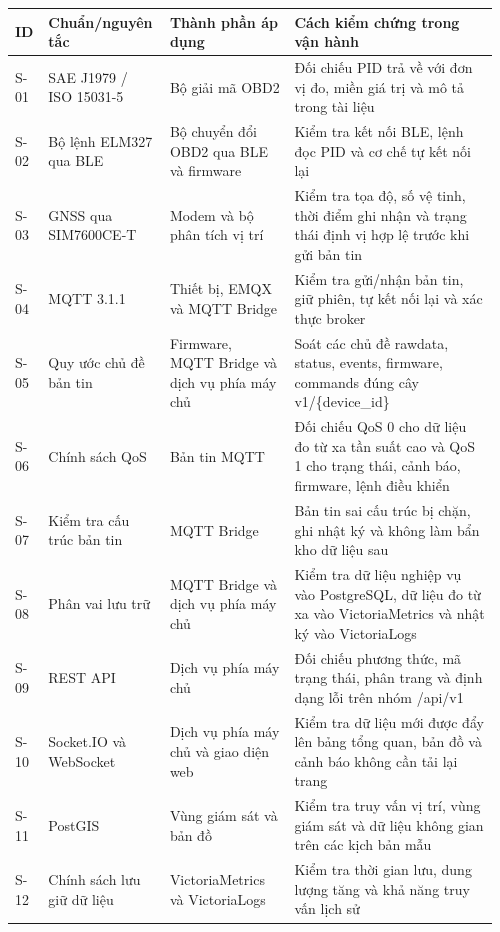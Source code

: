 \documentclass[a4paper]{extarticle}
\newcounter{none} %
\newcommand{\thesisterm}[1]{{\rmfamily #1}}
\begin{document}
{\def\LTcaptype{none} %
\begin{longtable}{|L{0.060\linewidth}|L{0.230\linewidth}|L{0.255\linewidth}|L{0.415\linewidth}|}
\hline
\textbf{ID} & \textbf{Chuẩn/nguyên tắc} & \textbf{Thành phần áp dụng} & \textbf{Cách kiểm chứng trong vận hành} \\
\hline
\endhead
\endfoot
\endlastfoot
S-01 & SAE J1979 / ISO 15031-5 & Bộ giải mã OBD2 & Đối chiếu PID trả về với đơn vị đo, miền giá trị và mô tả trong tài liệu \\\hline
S-02 & Bộ lệnh ELM327 qua BLE & Bộ chuyển đổi OBD2 qua BLE và firmware & Kiểm tra kết nối BLE, lệnh đọc PID và cơ chế tự kết nối lại \\\hline
S-03 & GNSS qua SIM7600CE-T & Modem và bộ phân tích vị trí & Kiểm tra tọa độ, số vệ tinh, thời điểm ghi nhận và trạng thái định vị hợp lệ trước khi gửi bản tin \\\hline
S-04 & MQTT 3.1.1 & Thiết bị, EMQX và MQTT Bridge & Kiểm tra gửi/nhận bản tin, giữ phiên, tự kết nối lại và xác thực broker \\\hline
S-05 & Quy ước chủ đề bản tin & Firmware, MQTT Bridge và dịch vụ phía máy chủ & Soát các chủ đề \thesisterm{rawdata}, \thesisterm{status}, \thesisterm{events}, \thesisterm{firmware}, \thesisterm{commands} đúng cây \thesisterm{v1/\{device\_id\}} \\\hline
S-06 & Chính sách QoS & Bản tin MQTT & Đối chiếu QoS 0 cho dữ liệu đo từ xa tần suất cao và QoS 1 cho trạng thái, cảnh báo, firmware, lệnh điều khiển \\\hline
S-07 & Kiểm tra cấu trúc bản tin & MQTT Bridge & Bản tin sai cấu trúc bị chặn, ghi nhật ký và không làm bẩn kho dữ liệu sau \\\hline
S-08 & Phân vai lưu trữ & MQTT Bridge và dịch vụ phía máy chủ & Kiểm tra dữ liệu nghiệp vụ vào PostgreSQL, dữ liệu đo từ xa vào VictoriaMetrics và nhật ký vào VictoriaLogs \\\hline
S-09 & REST API & Dịch vụ phía máy chủ & Đối chiếu phương thức, mã trạng thái, phân trang và định dạng lỗi trên nhóm \thesisterm{/api/v1} \\\hline
S-10 & Socket.IO và WebSocket & Dịch vụ phía máy chủ và giao diện web & Kiểm tra dữ liệu mới được đẩy lên bảng tổng quan, bản đồ và cảnh báo không cần tải lại trang \\\hline
S-11 & PostGIS & Vùng giám sát và bản đồ & Kiểm tra truy vấn vị trí, vùng giám sát và dữ liệu không gian trên các kịch bản mẫu \\\hline
S-12 & Chính sách lưu giữ dữ liệu & VictoriaMetrics và VictoriaLogs & Kiểm tra thời gian lưu, dung lượng tăng và khả năng truy vấn lịch sử \\\hline

\end{longtable}}
\end{document}
